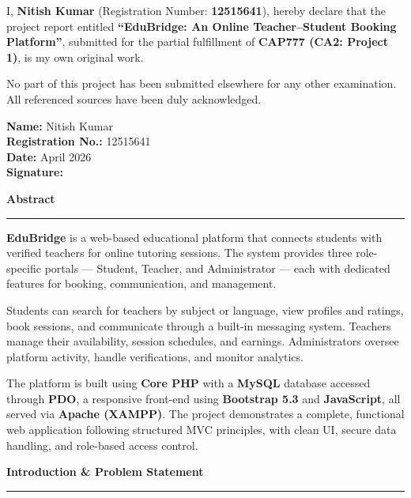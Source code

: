 \documentclass[12pt,a4paper]{report}
\begin{document}
\vspace{1cm}
I, \textbf{Nitish Kumar} (Registration Number: \textbf{12515641}), hereby declare that the project report entitled \textbf{``EduBridge: An Online Teacher--Student Booking Platform''}, submitted for the partial fulfillment of \textbf{CAP777 (CA2: Project 1)}, is my own original work.

\vspace{0.4cm}
No part of this project has been submitted elsewhere for any other examination. All referenced sources have been duly acknowledged.

\vspace{3cm}
\noindent\textbf{Name:} Nitish Kumar\\[0.5cm]
\textbf{Registration No.:} 12515641\\[0.5cm]
\textbf{Date:} April 2026\\[0.5cm]
\textbf{Signature:} \underline{\hspace{5cm}}

\newpage
\thispagestyle{plain}
{\large\bfseries Abstract}\\[0.6pt]
\rule{\textwidth}{0.6pt}

\vspace{0.6cm}
\textbf{EduBridge} is a web-based educational platform that connects students with verified teachers for online tutoring sessions. The system provides three role-specific portals — Student, Teacher, and Administrator — each with dedicated features for booking, communication, and management.

\vspace{0.4cm}
Students can search for teachers by subject or language, view profiles and ratings, book sessions, and communicate through a built-in messaging system. Teachers manage their availability, session schedules, and earnings. Administrators oversee platform activity, handle verifications, and monitor analytics.

\vspace{0.4cm}
The platform is built using \textbf{Core PHP} with a \textbf{MySQL} database accessed through \textbf{PDO}, a responsive front-end using \textbf{Bootstrap 5.3} and \textbf{JavaScript}, all served via \textbf{Apache (XAMPP)}. The project demonstrates a complete, functional web application following structured MVC principles, with clean UI, secure data handling, and role-based access control.

\newpage
\thispagestyle{plain}
{\large\bfseries Introduction \& Problem Statement}\\[0.6pt]
\rule{\textwidth}{0.6pt}
\end{document}
